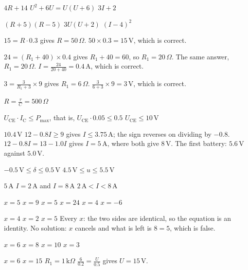
\begin{facit}

  $4R + 14$  $U^2 + 6U = U(U + 6)$  $3I + 2$

  $(R + 5)(R - 5)$  $3U(U + 2)$  $(I - 4)^2$

  $15 = R \cdot 0.3$ gives $R = 50\,\Omega$.
 $50 \times 0.3 = 15\,\text{V}$, which is correct.

  $24 = (R_1 + 40) \times 0.4$ gives $R_1 + 40 = 60$, so $R_1 = 20\,\Omega$.
 The same answer, $R_1 = 20\,\Omega$.
 $I = \frac{24}{20 + 40} = 0.4\,\text{A}$, which is correct.

  $3 = \frac{3}{R_1 + 3} \times 9$ gives $R_1 = 6\,\Omega$.
 $\frac{3}{6 + 3} \times 9 = 3\,\text{V}$, which is correct.

 $R = \frac{\tau}{C} = 500\,\Omega$

  $U_{\text{CE}} \cdot I_{\text{C}} \leq P_{\max}$, that is,
$U_{\text{CE}} \cdot 0.05 \leq 0.5$  $U_{\text{CE}} \leq 10\,\text{V}$

  $10.4\,\text{V}$
 $12 - 0.8I \geq 9$ gives $I \leq 3.75\,\text{A}$; the sign reverses on dividing by
$-0.8$.
 $12 - 0.8I = 13 - 1.0I$ gives $I = 5\,\text{A}$, where both give $8\,\text{V}$.
 The first battery: $5.6\,\text{V}$ against $5.0\,\text{V}$.

  $-0.5\,\text{V} \leq \delta \leq 0.5\,\text{V}$
 $4.5\,\text{V} \leq u \leq 5.5\,\text{V}$

  $5\,\text{A}$  $I = 2\,\text{A}$ and $I = 8\,\text{A}$
 $2\,\text{A} < I < 8\,\text{A}$

  $x = 5$  $x = 9$  $x = 5$  $x = 24$  $x = 4$
 $x = -6$

  $x = 4$  $x = 2$  $x = 5$
 Every $x$: the two sides are identical, so the equation is an identity.
 No solution: $x$ cancels and what is left is $8 = 5$, which is false.

  $x = 6$  $x = 8$  $x = 10$  $x = 3$

  $x = 6$  $x = 15$  $R_1 = 1\,\text{k}\Omega$
 $\frac{6}{0.2} = \frac{U}{0.5}$ gives $U = 15\,\text{V}$.


\end{facit}
